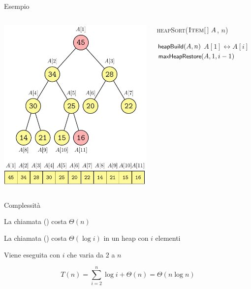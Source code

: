 \begin{frame}{Esempio}
\begin{columns}[T]
\begin{overprint}
\includegraphics[width=\textwidth,page=21]{heapsort.pdf}
\end{overprint}
\vspace{-9pt}
\begin{Procedure}
\caption[A]{\textsc{heapSort}($\textsc{Item}[\,]\ A$, \INTEGER $n$)}
$\textsf{{\small heapBuild}}(A, n)$\;
{
  \alert<1,5,7,9,11,13,15,17,19>{$A[1] \leftrightarrow A[i]$}\;
  \alert<2-4,6,8,10,12,14,16,18,20>{$\textsf{{\small maxHeapRestore}}(A, 1, i-1)$}\;
}
\end{Procedure}
\end{columns}
\end{frame}

\begin{frame}{Complessità}

\pause
\BIL
\item La chiamata \heapbuild() costa $\Theta(n)$
\item La chiamata \maxheapify() costa $\Theta(\log i)$ in un
heap con $i$ elementi
\item Viene eseguita con $i$ che varia da $2$ a $n$
\EIL

\[
T(n) = \sum_{i=2}^n \log i + \Theta(n) = \Theta(n \log n)
\]

\end{frame}

